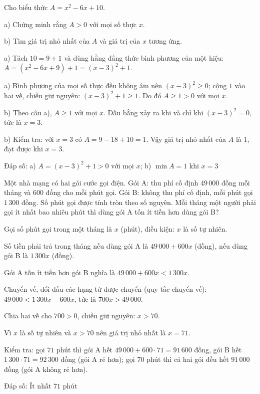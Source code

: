 \begin{problem}[9DS-BPT-016]
Cho biểu thức $A = x^2 - 6x + 10$.

a) Chứng minh rằng $A > 0$ với mọi số thực $x$.

b) Tìm giá trị nhỏ nhất của $A$ và giá trị của $x$ tương ứng.

\begin{solution}
a) Tách $10 = 9 + 1$ và dùng hằng đẳng thức bình phương của một hiệu: $A = (x^2 - 6x + 9) + 1 = (x - 3)^2 + 1$.

a) Bình phương của mọi số thực đều không âm nên $(x - 3)^2 \geq 0$; cộng $1$ vào hai vế, chiều giữ nguyên: $(x - 3)^2 + 1 \geq 1$. Do đó $A \geq 1 > 0$ với mọi $x$.

b) Theo câu a), $A \geq 1$ với mọi $x$. Dấu bằng xảy ra khi và chỉ khi $(x - 3)^2 = 0$, tức là $x = 3$.

b) Kiểm tra: với $x = 3$ có $A = 9 - 18 + 10 = 1$. Vậy giá trị nhỏ nhất của $A$ là $1$, đạt được khi $x = 3$.

Đáp số: a) $\boxed{A = (x - 3)^2 + 1 > 0 \text{ với mọi } x}$; b) $\boxed{\min A = 1 \text{ khi } x = 3}$
\end{solution}
\end{problem}

\begin{problem}[9DS-BPT-017]
Một nhà mạng có hai gói cước gọi điện. Gói A: thu phí cố định $49\,000$ đồng mỗi tháng và $600$ đồng cho mỗi phút gọi. Gói B: không thu phí cố định, mỗi phút gọi $1\,300$ đồng. Số phút gọi được tính tròn theo số nguyên. Mỗi tháng một người phải gọi ít nhất bao nhiêu phút thì dùng gói A tốn ít tiền hơn dùng gói B?

\begin{solution}
Gọi số phút gọi trong một tháng là $x$ (phút), điều kiện: $x$ là số tự nhiên.

Số tiền phải trả trong tháng nếu dùng gói A là $49\,000 + 600x$ (đồng), nếu dùng gói B là $1\,300x$ (đồng).

Gói A tốn ít tiền hơn gói B nghĩa là $49\,000 + 600x < 1\,300x$.

Chuyển vế, đổi dấu các hạng tử được chuyển (quy tắc chuyển vế): $49\,000 < 1\,300x - 600x$, tức là $700x > 49\,000$.

Chia hai vế cho $700 > 0$, chiều giữ nguyên: $x > 70$.

Vì $x$ là số tự nhiên và $x > 70$ nên giá trị nhỏ nhất là $x = 71$.

Kiểm tra: gọi $71$ phút thì gói A hết $49\,000 + 600 \cdot 71 = 91\,600$ đồng, gói B hết $1\,300 \cdot 71 = 92\,300$ đồng (gói A rẻ hơn); gọi $70$ phút thì cả hai gói đều hết $91\,000$ đồng (gói A không rẻ hơn).

Đáp số: $\boxed{\text{Ít nhất } 71 \text{ phút}}$
\end{solution}
\end{problem}


